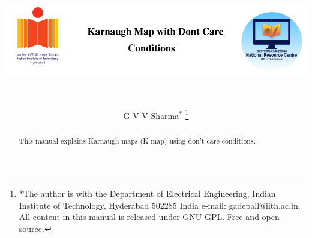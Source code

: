 \documentclass[journal,12pt,twocolumn]{IEEEtran}
\begin{document}
		
	
	\title{
		
		
		\includegraphics[width=15cm, height=4cm]{title}
		\centering
		
	}
	\author{G V V Sharma$^{*}$%
		\thanks{*The author is with the Department
			of Electrical Engineering, Indian Institute of Technology, Hyderabad
			502285 India e-mail:  gadepall@iith.ac.in. All content in this manual is released under GNU GPL.  Free and open source.}}


\maketitle

\tableofcontents

\bigskip

\renewcommand{\thefigure}{\theenumi}
\renewcommand{\thetable}{\theenumi}

\begin{abstract}
This manual explains Karnaugh maps (K-map) using don't care conditions.
\end{abstract}
%
\end{document}
